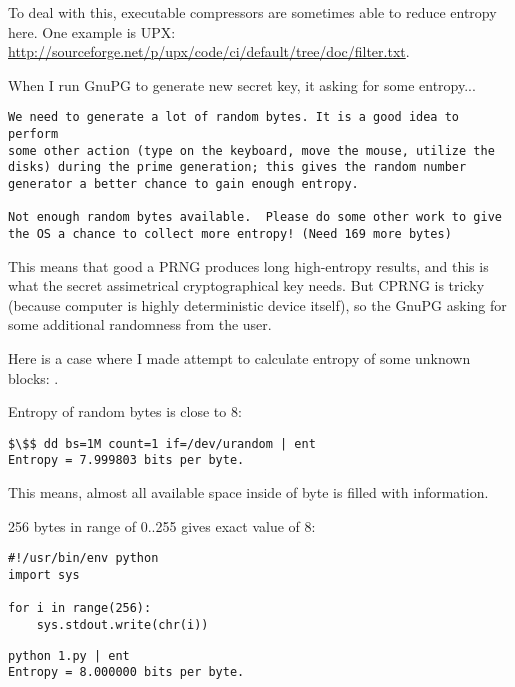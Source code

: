 To deal with this, executable compressors are sometimes able to reduce entropy here.
One example is UPX: \url{http://sourceforge.net/p/upx/code/ci/default/tree/doc/filter.txt}.


When I run GnuPG to generate new secret key, it asking for some entropy...

\begin{lstlisting}
We need to generate a lot of random bytes. It is a good idea to perform
some other action (type on the keyboard, move the mouse, utilize the
disks) during the prime generation; this gives the random number
generator a better chance to gain enough entropy.

Not enough random bytes available.  Please do some other work to give
the OS a chance to collect more entropy! (Need 169 more bytes)
\end{lstlisting}

This means that good a PRNG produces long high-entropy results, and this is what the secret assimetrical cryptographical key needs.
But \ac{CPRNG} is tricky (because computer is highly deterministic device itself),
so the GnuPG asking for some additional randomness from the user.

Here is a case where I made attempt to calculate entropy of some unknown blocks: .


Entropy of random bytes is close to 8:

\begin{lstlisting}[basicstyle=\ttfamily, mathescape]
$\$$ dd bs=1M count=1 if=/dev/urandom | ent
Entropy = 7.999803 bits per byte.
\end{lstlisting}

This means, almost all available space inside of byte is filled with information.

256 bytes in range of 0..255 gives exact value of 8:

\begin{lstlisting}[basicstyle=\ttfamily, mathescape]
#!/usr/bin/env python
import sys

for i in range(256):
    sys.stdout.write(chr(i))
\end{lstlisting}

\begin{lstlisting}[basicstyle=\ttfamily, mathescape]
python 1.py | ent
Entropy = 8.000000 bits per byte.
\end{lstlisting}

